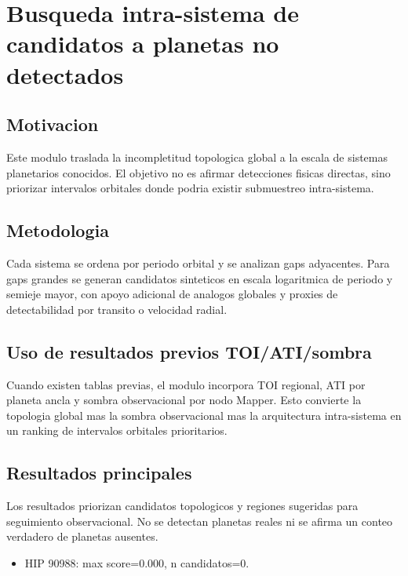 \section{Busqueda intra-sistema de candidatos a planetas no detectados}

\subsection{Motivacion}

Este modulo traslada la incompletitud topologica global a la escala de sistemas planetarios conocidos. El objetivo no es afirmar detecciones fisicas directas, sino priorizar intervalos orbitales donde podria existir submuestreo intra-sistema.

\subsection{Metodologia}

Cada sistema se ordena por periodo orbital y se analizan gaps adyacentes. Para gaps grandes se generan candidatos sinteticos en escala logaritmica de periodo y semieje mayor, con apoyo adicional de analogos globales y proxies de detectabilidad por transito o velocidad radial.

\subsection{Uso de resultados previos TOI/ATI/sombra}

Cuando existen tablas previas, el modulo incorpora TOI regional, ATI por planeta ancla y sombra observacional por nodo Mapper. Esto convierte la topologia global mas la sombra observacional mas la arquitectura intra-sistema en un ranking de intervalos orbitales prioritarios.

\subsection{Resultados principales}

Los resultados priorizan candidatos topologicos y regiones sugeridas para seguimiento observacional. No se detectan planetas reales ni se afirma un conteo verdadero de planetas ausentes.

\begin{itemize}

\item HIP 90988: max score=0.000, n candidatos=0.

\end{itemize}

